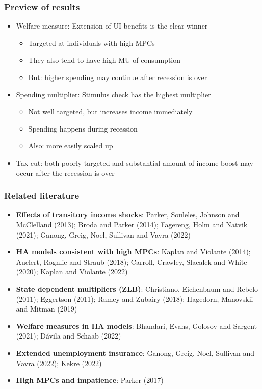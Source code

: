 \documentclass[pdflatex,aspectratio=169]{beamer}
\begin{document}

\begin{frame}
\frametitle{Preview of results}
\begin{itemize}
\itemsep = \bigskipamount 
\item Welfare measure: Extension of UI benefits is the clear winner 
	\begin{itemize}
	\itemsep = .25\bigskipamount 
	\item Targeted at individuals with high MPCs 
	\item They also tend to have high MU of consumption 
	\item But: higher spending may continue after recession is over 
	\end{itemize}
\item Spending multiplier: Stimulus check has the highest multiplier 
	\begin{itemize}
	\itemsep = .25\bigskipamount 
	\item Not well targeted, but increases income immediately 
	\item Spending happens during recession 
	\item Also: more easily scaled up 
	\end{itemize}
\item Tax cut: both poorly targeted and substantial amount of income boost may occur after the recession is over
\end{itemize}
\end{frame}

\begin{frame}
\frametitle{Related literature}
\small
\begin{itemize}
	\item \textbf{Effects of transitory income shocks}: 
	Parker, Souleles, Johnson and McClelland (2013); Broda and Parker (2014); Fagereng, Holm and Natvik (2021); Ganong, Greig, Noel, Sullivan and Vavra (2022)
	\item \textbf{HA models consistent with high MPCs}: 
	Kaplan and Violante (2014); Auclert, Rognlie and Straub (2018); Carroll, Crawley, Slacalek and White (2020); Kaplan and Violante (2022) 
	\item \textbf{State dependent multipliers (ZLB)}: 
	Christiano, Eichenbaum and Rebelo (2011); Eggertson (2011); Ramey and Zubairy (2018); Hagedorn, Manovskii and Mitman (2019) 
	\item \textbf{Welfare measures in HA models}:
	Bhandari, Evans, Golosov and Sargent (2021); D{\'a}vila and Schaab (2022)
	\item \textbf{Extended unemployment insurance}:
	Ganong, Greig, Noel, Sullivan and Vavra (2022); Kekre (2022) 
	\item \textbf{High MPCs and impatience}: Parker (2017)
\end{itemize}
\normalsize
\end{frame}
\end{document}
